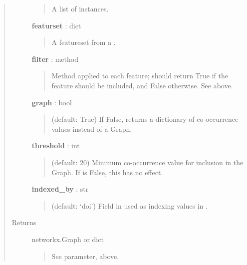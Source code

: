 \documentclass[letterpaper,10pt,english]{sphinxmanual}
\begin{document}
\begin{fulllineitems}
\begin{quote}
\begin{description}
\begin{quote}
A list of {\hyperref[tethne.classes.paper:tethne.classes.paper.Paper]{}} instances.
\end{quote}

\textbf{featurset} : dict
\begin{quote}

A featureset from a {\hyperref[tethne.classes.corpus:tethne.classes.corpus.Corpus]{}}.
\end{quote}

\textbf{filter} : method
\begin{quote}

Method applied to each feature; should return True if the feature should
be included, and False otherwise. See above.
\end{quote}

\textbf{graph} : bool
\begin{quote}

(default: True) If False, returns a dictionary of co-occurrence values
instead of a Graph.
\end{quote}

\textbf{threshold} : int
\begin{quote}

(default: 20) Minimum co-occurrence value for inclusion in the Graph. 
If  is False, this has no effect.
\end{quote}

\textbf{indexed\_by} : str
\begin{quote}

(default: `doi') Field in {\hyperref[tethne.classes.paper:tethne.classes.paper.Paper]{}} used as indexing values in 
.
\end{quote}

\item[{Returns}] \leavevmode
networkx.Graph or dict
\begin{quote}

See  parameter, above.
\end{quote}

\end{description}\end{quote}

\end{fulllineitems}

\end{document}
